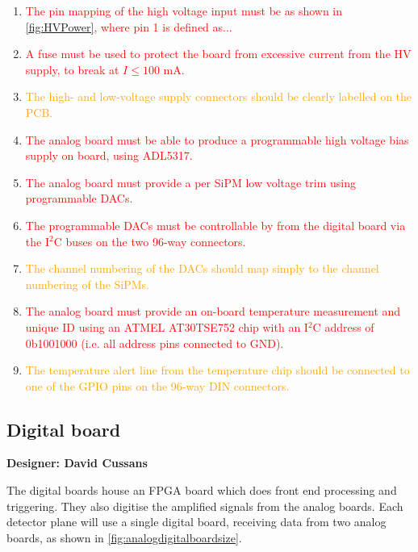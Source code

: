\documentclass[a4paper]{article}
\newcommand{\must}[1]{\textcolor{red}{#1}}
\newcommand{\should}[1]{\textcolor{orange}{#1}}
\def\I2C{I$^2$C}
\begin{document}
\begin{enumerate}
    \item \must{The pin mapping of the high voltage input must be as shown in \cref{fig:HVPower}, where pin 1 is defined as...}
    \item \must{A fuse must be used to protect the board from excessive current from the HV supply, to break at $I \le 100$ mA.}
    \item \should{The high- and low-voltage supply connectors should be clearly labelled on the PCB.}
    \item \must{The analog board must be able to produce a programmable high voltage bias supply on board, using ADL5317.}
    \item \must{The analog board must provide a per SiPM low voltage trim using programmable DACs.}
    \item \must{The programmable DACs must be controllable by from the digital board via the \I2C buses on the two 96-way connectors.}
    \item \should{The channel numbering of the DACs should map simply to the channel numbering of the SiPMs.}
    \item \must{The analog board must provide an on-board temperature measurement and unique ID using an ATMEL AT30TSE752 chip with an \I2C address of 0b1001000 (i.e. all address pins connected to GND).} 
    \item \should{The temperature alert line from the temperature chip should be connected to one of the GPIO pins on the 96-way DIN connectors.}
\end{enumerate}

\clearpage
\newpage

\subsection{Digital board}

{\bf Designer: David Cussans}

The digital boards house an FPGA board which does front end processing and triggering.
They also digitise the amplified signals from the analog boards.
Each detector plane will use a single digital board, receiving data from two analog boards, as shown in \cref{fig:analogdigitalboardsize}.


\end{document}
